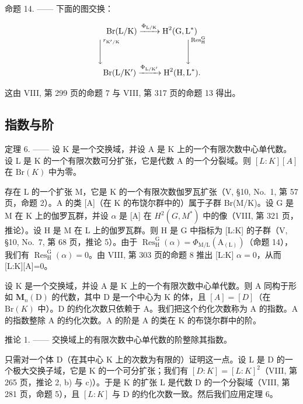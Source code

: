 命题 14. —— 下面的图交换：

\[
\begin{array}{c} \operatorname{Br} (\mathrm{L} / \mathrm{K}) \xrightarrow {\Phi_ {\mathrm{L} / \mathrm{K}}} \operatorname{H} ^ {2} (\operatorname{G}, \operatorname{L} ^ {*}) \\ \Biggl \downarrow^ {r _ {\mathrm{K} ^ {\prime} / \mathrm{K}}} \qquad \qquad \qquad \qquad \Biggl \downarrow^ {\operatorname{Res} _ {\mathrm{H}} ^ {\mathrm{G}}} \\ \operatorname{Br} (\mathrm{L} / \mathrm{K} ^ {\prime}) \xrightarrow {\Phi_ {\mathrm{L} / \mathrm{K} ^ {\prime}}} \operatorname{H} ^ {2} (\operatorname{H}, \operatorname{L} ^ {*})  . \end{array}
\]

这由 VIII, 第 299 页的命题 7 与 VIII, 第 317 页的命题 13 得出。

\subsection{指数与阶}

定理 6. —— 设 K 是一个交换域，并设 A 是 K 上的一个有限次数中心单代数。设 L 是 K 的一个有限次数可分扩张，它是代数 A 的一个分裂域。则 \([L:K][A]\) 在 \(\mathrm{Br}(K)\) 中为零。

存在 L 的一个扩张 M，它是 K 的一个有限次数伽罗瓦扩张（V, §10, No.~1, 第 57 页，命题 2）。A 的类 {[}A{]}（在 K 的布饶尔群中的）属于子群 Br(M/K)。设 G 是 M 在 K 上的伽罗瓦群，并设 \(\alpha\) 是 {[}A{]} 在 \(H^{2}(G,M^{*})\) 中的像（VIII, 第 321 页，推论）。设 H 是 M 在 L 上的伽罗瓦群。则 H 是 G 中指标为 {[}L:K{]} 的子群（V, §10, No.~7, 第 68 页，推论 5）。由于 \(\operatorname{Res}_{\mathrm{H}}^{\mathrm{G}}(\alpha)=\Phi_{\mathrm{M/L}}(\mathrm{A}_{(\mathrm{L})})\)（命题 14），我们有 \(\operatorname{Res}_{\mathrm{H}}^{\mathrm{G}}(\alpha)=0\)。由 VIII, 第 303 页的命题 8 推出 {[}L:K{]} \(\alpha=0\)，从而 {[}L:K{]}{[}A{]}=0。

设 K 是一个交换域，并设 A 是 K 上的一个有限次数中心单代数。则 A 同构于形如 \(\mathbf{M}_{n}(\mathrm{D})\) 的代数，其中 D 是一个中心为 K 的体，且 \([A]=[D]\)（在 \(\mathrm{Br}(K)\) 中）。D 的约化次数只依赖于 A。我们把这个约化次数称为 A 的指数。A 的指数整除 A 的约化次数。A 的阶是 A 的类在 K 的布饶尔群中的阶。

推论 1. —— 交换域上的有限次数中心单代数的阶整除其指数。

只需对一个体 D（在其中心 K 上的次数为有限的）证明这一点。设 L 是 D 的一个极大交换子域，它是 K 的一个可分扩张；我们有 \([D:K]=[L:K]^{2}\)（VIII, 第 265 页，推论 2, b) 与 c)）。于是 K 的扩张 L 是代数 D 的一个分裂域（VIII, 第 281 页，命题 5），且 \([L:K]\) 与 D 的约化次数一致。然后我们应用定理 6。

